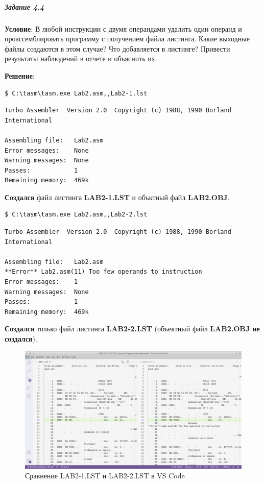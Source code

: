 \subparagraph{Задание 4.4}

\textbf{Условие}:
В любой инструкции с двумя операндами удалить один операнд и проассемблировать программу с получением файла листинга. Какие выходные файлы создаются в этом случае? Что добавляется в листинге? Привести результаты наблюдений в отчете и объяснить их.

\textbf{Решение}:

\begin{lstlisting}[language=Terminal]
$ C:\tasm\tasm.exe Lab2.asm,,Lab2-1.lst
\end{lstlisting}

\begin{lstlisting}[language=Out]
Turbo Assembler  Version 2.0  Copyright (c) 1988, 1990 Borland International

Assembling file:   Lab2.asm
Error messages:    None
Warning messages:  None
Passes:            1
Remaining memory:  469k
\end{lstlisting}

\textbf{Создался} файл листинга \textbf{LAB2-1.LST} и объктный файл \textbf{LAB2.OBJ}.

\begin{lstlisting}[language=Terminal]
$ C:\tasm\tasm.exe Lab2.asm,,Lab2-2.lst
\end{lstlisting}

\begin{lstlisting}[language=Out]
Turbo Assembler  Version 2.0  Copyright (c) 1988, 1990 Borland International

Assembling file:   Lab2.asm
**Error** Lab2.asm(11) Too few operands to instruction
Error messages:    1
Warning messages:  None
Passes:            1
Remaining memory:  469k
\end{lstlisting}

\textbf{Создался} только файл листинга \textbf{LAB2-2.LST} (объектный файл \textbf{LAB2.OBJ не создался}).

\begin{figure}[h]
    \centering
    \includegraphics[width=18cm]
        {../_INCLUDES/task-4-4/lst1-and-lst2.png}
    \caption{Сравнение LAB2-1.LST и LAB2-2.LST в VS Code}
\end{figure}
